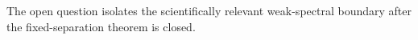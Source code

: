 The open question isolates the scientifically relevant weak-spectral boundary after the fixed-separation theorem is closed.